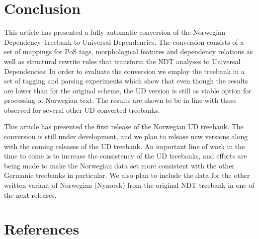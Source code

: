 \documentclass[10pt, a4paper]{article}
\begin{document}
\section{Conclusion}
This article has presented a fully automatic conversion of the
Norwegian Dependency Treebank to Universal Dependencies. The
conversion consists of a set of mappings for PoS tags, morphological
features and dependency relations as well as structural rewrite rules
that transform the NDT analyses to Universal Dependencies. In order to
evaluate the conversion we employ the treebank in a set of tagging and
parsing experiments which show that even though the results are lower
than for the original scheme, the UD version is still as viable option
for processing of Norwegian text. The results are shown to be in line
with those observed for several other UD converted treebanks.

This article has presented the first release of the Norwegian UD
treebank. The conversion is still under development, and we plan to
release new versions along with the coming releases of the UD
treebank. An important line of work in the time to come is to increase
the consistency of the UD treebanks, and efforts are being made to
make the Norwegian data set more consistent with the other Germanic
treebanks in particular. We also plan to include the data for the
other written variant of Norwegian (Nynorsk) from the original NDT
treebank in one of the next releases.

\section{References}
\label{main:ref}






%
%
\end{document}
